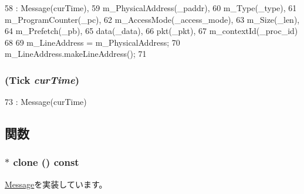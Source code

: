 \begin{DoxyCode}
58         : Message(curTime),
59           m_PhysicalAddress(_paddr),
60           m_Type(_type),
61           m_ProgramCounter(_pc),
62           m_AccessMode(_access_mode),
63           m_Size(_len),
64           m_Prefetch(_pb),
65           data(_data),
66           pkt(_pkt),
67           m_contextId(_proc_id)
68     {
69       m_LineAddress = m_PhysicalAddress;
70       m_LineAddress.makeLineAddress();
71     }
\end{DoxyCode}
\hypertarget{classRubyRequest_a5b30411c5d1e4fa31513ce58b01b4c41}{
\subsubsection[{RubyRequest}]{ ({\bf Tick} {\em curTime})}}
\label{classRubyRequest_a5b30411c5d1e4fa31513ce58b01b4c41}



\begin{DoxyCode}
73 : Message(curTime) {}
\end{DoxyCode}


\subsection{関数}
\hypertarget{classRubyRequest_a2589cd17f2bbc4a7cd72c3996d880819}{
\subsubsection[{clone}]{$\ast$ clone () const}}
\label{classRubyRequest_a2589cd17f2bbc4a7cd72c3996d880819}


\hyperlink{classMessage_a78f6e5c1dc41f5316e10bba31ee0d8a1}{Message}を実装しています。


